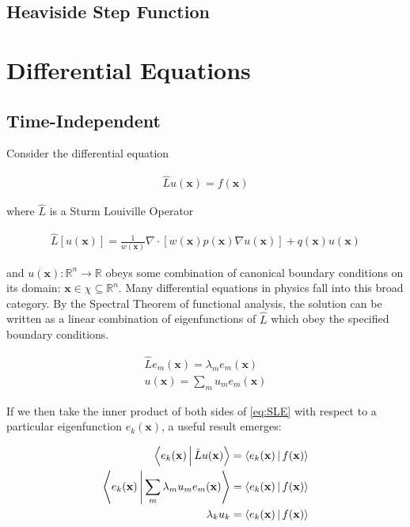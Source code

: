 \documentclass[11pt]{article}
\theoremstyle{plain}
\theoremstyle{definition}
\renewcommand{\vec}[1]{\mathbf{#1}} %
\begin{document}
\subsection{Heaviside Step Function}


\section{Differential Equations}
\subsection{Time-Independent}

Consider the differential equation

\begin{align}
    \hat L u(\vec x) = f(\vec x) \label{eq:SLE}
\end{align}

where $\hat L$ is a Sturm Louiville Operator

\begin{align}
    \hat L \left[ u\left( \vec x \right) \right] = \frac{1}{w(\vec x)} \nabla \cdot \left[ w(\vec x) p(\vec x) \nabla u(\vec x) \right] + q(\vec x)u(\vec x)
\end{align}

and $u(\vec x): \mathbb{R}^n \rightarrow \mathbb{R}$ obeys some combination of canonical boundary conditions on its domain: $\vec x \in \chi \subseteq \mathbb{R}^n$. Many differential equations in physics fall into this broad category. By the Spectral Theorem of functional analysis, the solution can be written as a linear combination of eigenfunctions of $\hat L$ which obey the specified boundary conditions.

\begin{align}
    \hat L e_m(\vec x) = \lambda_m e_m(\vec x) \\
    u(\vec x) = \sum\limits_m u_m e_m(\vec x)
\end{align}

If we then take the inner product of both sides of \eqref{eq:SLE} with respect to a particular eigenfunction $e_k(\vec x)$, a useful result emerges:

\begin{align}
    \Braket{e_k(\vec x) | \hat L u(\vec x)} &= \Braket{e_k(\vec x) | f(\vec x)} \\
    \Braket{e_k(\vec x) | \sum\limits_m \lambda_m u_m e_m(\vec x)} &= \Braket{e_k(\vec x) | f(\vec x)} \\
    \lambda_k u_k &= \Braket{e_k(\vec x) | f(\vec x)}
\end{align}
\end{document}
